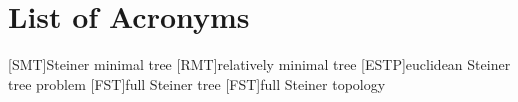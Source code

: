 {
\abnormalparskip{0pt}
\chapter{List of Acronyms}
}

\begin{acronym}
  [SMT]{Steiner minimal tree}
  [RMT]{relatively minimal tree}
  [ESTP]{euclidean Steiner tree problem}
  [FST]{full Steiner tree}
  [FST]{full Steiner topology}
\end{acronym}


